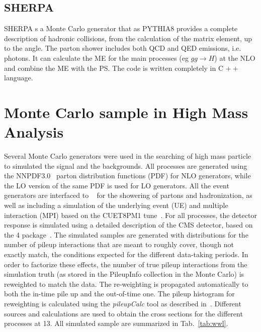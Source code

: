  
\subsection*{S{\footnotesize HERPA}}  S{\footnotesize HERPA}  \cite{bib:sherpa} s a Monte Carlo generator that as PYTHIA8 provides a complete description of hadronic collisions, from the calculation of the matrix element, up to the angle. The parton shower includes both QCD and QED emissions, i.e. photons. It can calculate the ME for the main processes (eg $ gg \rightarrow H $) at the NLO and combine the ME with the PS. The code is written completely in C $ ++ $ language.




\section{Monte Carlo sample in High Mass Analysis}

Several  Monte Carlo  generators were used in the searching of high mass particle to simulated the signal and the backgrounds. 
All processes are generated using the NNPDF3.0~\cite{Ball:2013hta,Ball:2011uy} parton distribution functions (PDF) for NLO generators,
while the LO version of the same PDF is used for LO generators. All the event generators are interfaced 
to ~\cite{Sjostrand:2007gs} for the showering of
partons and hadronization, as well as including a simulation of the underlying event (UE) and multiple interaction (MPI)
based on the CUET8PM1 tune~\cite{Khachatryan:2015pea}. 
For all processes, the detector response is simulated using a detailed
description of the CMS detector, based on the \GEANT{}4 package~\cite{Agostinelli:2002hh}. 
The simulated samples are generated with distributions for the number of pileup interactions that are meant to roughly cover,
though not exactly match, the conditions expected for the different data-taking periods. In order to factorize these effects, 
the number of true pileup interactions from the simulation truth (as stored in the PileupInfo collection in the Monte Carlo)
is reweighted to match the data.
The re-weighting is propagated automatically to both the in-time pile up and the out-of-time one.
The pileup histogram for reweighting is calculated using the \emph{pileupCalc} tool as described in~\cite{puJSON}. 
Different sources and calculations are used to obtain the cross sections for the different processes at 13\TeV. 
All simulated sample are summarized in Tab.~\ref{tab:wwl}.



